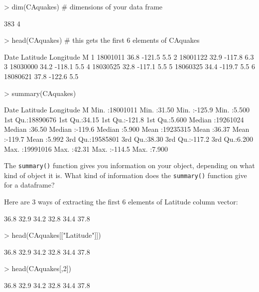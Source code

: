 \documentclass{exam}
\begin{document}
\begin{Schunk}
\begin{Sinput}
> dim(CAquakes) # dimensions of your data frame
\end{Sinput}
\begin{Soutput}
[1] 383   4
\end{Soutput}
\begin{Sinput}
> head(CAquakes)  # this gets the first 6 elements of CAquakes
\end{Sinput}
\begin{Soutput}
      Date Latitude Longitude   M
1 18001011     36.8    -121.5 5.5
2 18001122     32.9    -117.8 6.3
3 18030000     34.2    -118.1 5.5
4 18030525     32.8    -117.1 5.5
5 18060325     34.4    -119.7 5.5
6 18080621     37.8    -122.6 5.5
\end{Soutput}
\begin{Sinput}
> summary(CAquakes)  
\end{Sinput}
\begin{Soutput}
      Date             Latitude       Longitude            M        
 Min.   :18001011   Min.   :31.50   Min.   :-125.9   Min.   :5.500  
 1st Qu.:18890676   1st Qu.:34.15   1st Qu.:-121.8   1st Qu.:5.600  
 Median :19261024   Median :36.50   Median :-119.6   Median :5.900  
 Mean   :19235315   Mean   :36.37   Mean   :-119.7   Mean   :5.992  
 3rd Qu.:19585801   3rd Qu.:38.30   3rd Qu.:-117.2   3rd Qu.:6.200  
 Max.   :19991016   Max.   :42.31   Max.   :-114.5   Max.   :7.900  
\end{Soutput}
\end{Schunk}
\noindent The \texttt{summary()} function gives you information on your object, depending on what kind of object it is. What kind of information does the \texttt{summary()} function give for a dataframe?

\noindent Here are 3 ways of extracting the first 6 elements of Latitude column vector:
\begin{Schunk}
\begin{Soutput}
[1] 36.8 32.9 34.2 32.8 34.4 37.8
\end{Soutput}
\begin{Sinput}
> head(CAquakes[["Latitude"]])
\end{Sinput}
\begin{Soutput}
[1] 36.8 32.9 34.2 32.8 34.4 37.8
\end{Soutput}
\begin{Sinput}
> head(CAquakes[,2])
\end{Sinput}
\begin{Soutput}
[1] 36.8 32.9 34.2 32.8 34.4 37.8
\end{Soutput}
\end{Schunk}
\end{document}

